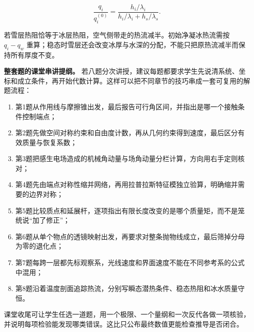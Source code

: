 \documentclass[12pt,a4paper,UTF8]{ctexart}
\newcommand{\tightlist}{\setlength{\itemsep}{0pt}\setlength{\parskip}{0pt}}
\begin{document}
\[
\frac{q_i}{q_i^{(0)}}=\frac{h_i/\lambda_i}{h_i/\lambda_i+h_s/\lambda_s}.
\]

若雪层热阻恰等于冰层热阻，空气侧带走的热流减半。初始净凝冰热流需按
\(q_i-q_w\)
重算；稳态时雪层还会改变冰厚与水深的分配，不能只把原热流减半而保持所有厚度不变。

\textbf{整套题的课堂串讲提纲。}
若八题分次讲授，建议每题都要求学生先说清系统、坐标和成立条件，再开始代数计算。这样可以把不同章节的技巧串成一套可复用的解题流程：

\begin{enumerate}
\def\labelenumi{\arabic{enumi}.}
\tightlist
\item
  第1题从作用线与摩擦锥出发，最后报告可行角区间，并指出是哪一个接触条件控制端点；
\item
  第2题先做空间对称约束和自由度计数，再从几何约束得到速度，最后区分有效质量与恢复系数；
\item
  第3题把感生电场造成的机械角动量与场角动量分栏计算，方向用右手定则核对；
\item
  第4题先由端点对称性缩并网络，再用拉普拉斯特征模独立验算，明确缩并需要的边界对称；
\item
  第5题比较质点和延展杆，逐项指出有限长度改变的是哪个质量矩，而不是笼统说``加了修正''；
\item
  第6题从单个物点的透镜映射出发，再要求对整条抛物线成立，最后筛掉分母为零的退化点；
\item
  第7题每跨一层都先标观察系，光线速度和界面速度不能在不同参考系的公式中混用；
\item
  第8题沿着温度剖面追踪热流，分别写瞬态潜热条件、稳态热阻和冰水质量守恒。
\end{enumerate}

课堂收尾可让学生任选一道题，用一个极限、一个量纲和一次反代各做一项核验，并说明每项检验能发现哪类错误。这比只公布最终数值更能检查推导是否闭合。
\end{document}
